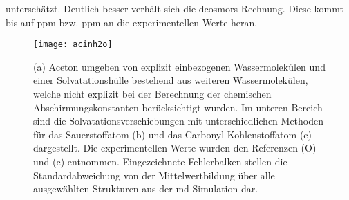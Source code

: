 unterschätzt. Deutlich besser verhält sich die \ac{dcosmors}-Rechnung. Diese kommt bis auf \unit[9]{ppm} bzw. \unit[3]{ppm} an die experimentellen Werte heran. 
	\begin{figure}[ht!]
	\centering
	\texttt{[image: acinh2o]}
	\captionsetup{figurewithin = chapter}
	\captionsetup{font=small, labelfont=bf}\caption[Solvatationseffekte für Aceton in Wasser]{(a) Aceton umgeben von explizit einbezogenen Wassermolekülen und einer Solvatationshülle bestehend aus weiteren Wassermolekülen, welche nicht explizit bei der Berechnung der chemischen Abschirmungskonstanten berücksichtigt wurden. Im unteren Bereich sind die Solvatationsverschiebungen mit unterschiedlichen Methoden für das Sauerstoffatom \textsf{(b)} und das Carbonyl-Kohlenstoffatom \textsf{(c)} dargestellt. Die experimentellen Werte wurden den Referenzen \cite{cossi2003different} (O) und \cite{tiffon1978effet} \textsf{(c)} entnommen. Eingezeichnete Fehlerbalken stellen die Standardabweichung von der Mittelwertbildung über alle ausgewählten Strukturen aus der \ac{md}-Simulation dar.}
\label{abb:acinh2o}
\end{figure}
\FloatBarrier
